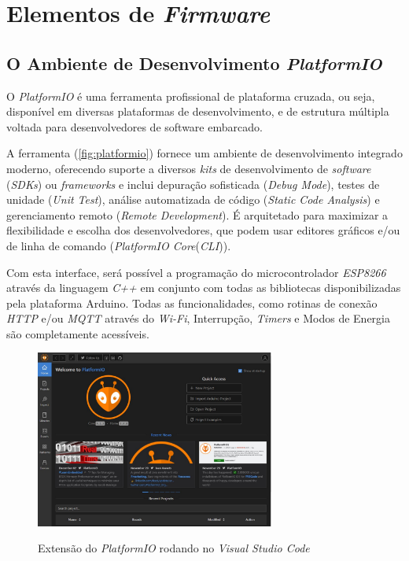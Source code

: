 
\section{Elementos de \textit{Firmware}}

\subsection{O Ambiente de Desenvolvimento \textit{PlatformIO}}


O \textit{PlatformIO} é uma ferramenta profissional de plataforma cruzada, ou seja, disponível em diversas plataformas de desenvolvimento, e de estrutura múltipla voltada para desenvolvedores de software embarcado.

A ferramenta (\autoref{fig:platformio}) fornece um ambiente de desenvolvimento integrado moderno, oferecendo suporte a diversos \textit{kits} de desenvolvimento de \textit{software} (\textit{SDKs}) ou \textit{frameworks} e inclui depuração sofisticada (\textit{Debug Mode}), testes de unidade (\textit{Unit Test}), análise automatizada de código (\textit{Static Code Analysis}) e gerenciamento remoto (\textit{Remote Development}). É arquitetado para maximizar a flexibilidade e escolha dos desenvolvedores, que podem usar editores gráficos e/ou de linha de comando (\textit{PlatformIO Core}(\textit{CLI})).

Com esta interface, será possível a programação do microcontrolador \textit{ESP8266} através da linguagem \textit{C++} em conjunto com todas as bibliotecas disponibilizadas pela plataforma Arduino. Todas as funcionalidades, como rotinas de conexão \textit{HTTP} e/ou \textit{MQTT} através do \textit{Wi-Fi}, Interrupção, \textit{Timers} e Modos de Energia são completamente acessíveis. 

\begin{figure}[H]
	\centering
	\caption{Extensão do \textit{PlatformIO} rodando no \textit{Visual Studio Code}}
	\includegraphics[width=0.7\textwidth]{figuras/platformio.jpg}
	\label{fig:platformio}
	
\end{figure}


